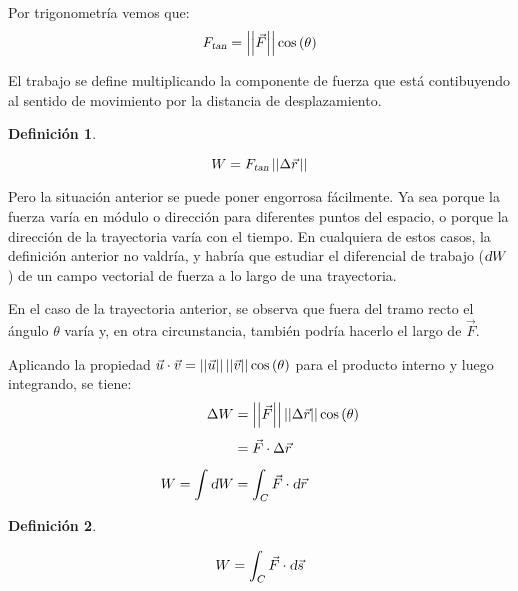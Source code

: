\documentclass[a5paper,12pt,twoside]{book}
\newtheorem{defn}{{Definición}}[chapter]
\begin{document}
Por trigonometría vemos que:
\begin{equation*}
    {{F}_\textsl{{tan}}} = {\left|\left| {\vec{F}} \right|\right|} \cos\left(\theta\right)
\end{equation*}

El trabajo se define multiplicando la componente de fuerza que está contibuyendo al sentido de movimiento por la distancia de desplazamiento.

\begin{mdframed}[style=MyFrame1]
    \begin{defn}
    \end{defn}
    \begin{equation*}
        W = {{F}_\textsl{{tan}}} \, {\left|\left| {\Delta \vec{r}\hspace{0.05cm}} \right|\right|}
    \end{equation*}
\end{mdframed}

Pero la situación anterior se puede poner engorrosa fácilmente. Ya sea porque la fuerza varía en módulo o dirección para diferentes puntos del espacio, o porque la dirección de la trayectoria varía con el tiempo. En cualquiera de estos casos, la definición anterior no valdría, y habría que estudiar el diferencial de trabajo ($\textsl{d} W$) de un campo vectorial de fuerza a lo largo de una trayectoria.

En el caso de la trayectoria anterior, se observa que fuera del tramo recto el ángulo $\theta$ varía y, en otra circunstancia, también podría hacerlo el largo de $\vec{F}$.

\begin{center}
    \def\svgwidth{0.8\linewidth}
    
\end{center}

Aplicando la propiedad $\vec{u} \cdot \vec{v} = {\left|\left| {\vec{u}} \right|\right|} \, {\left|\left| {\vec{v}} \right|\right|} \cos\left(\theta\right)$ para el producto interno y luego integrando, se tiene:
\begin{align*}
    \Delta W &= {\left|\left| {\vec{F}} \right|\right|} \, {\left|\left| {\Delta \vec{r}} \right|\right|} \cos\left(\theta\right)
    \\[1ex]
    &= \vec{F} \cdot \Delta \vec{r}\hspace{0.05cm}
    \\[1ex]
    W = \int \textsl{d} W &= \int_C \vec{F} \cdot \textsl{d} \vec{r}\hspace{0.05cm}
\end{align*}

\begin{mdframed}[style=MyFrame1]
    \begin{defn}
        \label{defn:workLineIntegral}
    \end{defn}
    \begin{equation*}
        W = \int_C \Vec{F} \cdot \textsl{d} \Vec{s}
    \end{equation*}
\end{mdframed}
\end{document}
